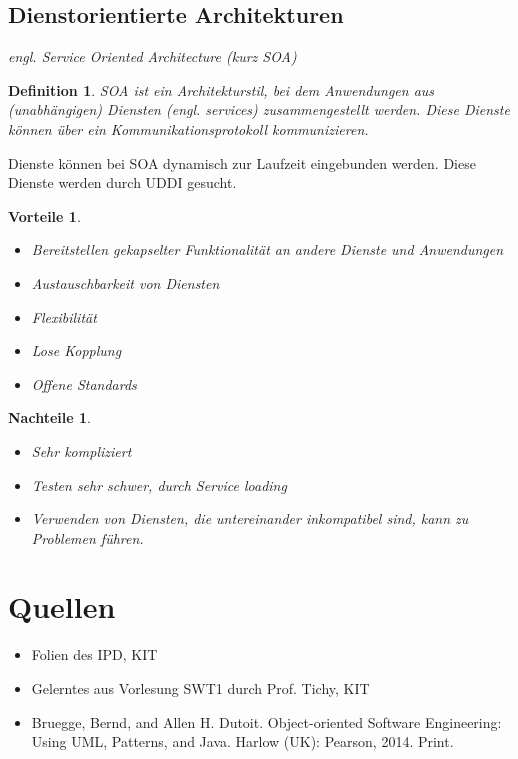 \documentclass[a4paper]{article}
\theoremstyle{break}
\newtheorem{defi}{Definition}[section]
\newtheorem{why}{Vorteile}[section]
\newtheorem{whynot}{Nachteile}[section]
\begin{document}
\subsection{Dienstorientierte Architekturen}
\textit{engl. Service Oriented Architecture (kurz SOA)}
\begin{defi}
	SOA ist ein Architekturstil, bei dem Anwendungen aus (unabhängigen) Diensten (engl. services) zusammengestellt werden. Diese Dienste können über ein Kommunikationsprotokoll kommunizieren.
\end{defi}
Dienste können bei SOA dynamisch zur Laufzeit eingebunden werden. Diese Dienste werden durch UDDI gesucht. 
\begin{why}
	\begin{itemize}
		\item Bereitstellen gekapselter Funktionalität an andere Dienste und Anwendungen
		\item Austauschbarkeit von Diensten
		\item Flexibilität
		\item Lose Kopplung
		\item Offene Standards
	\end{itemize}
\end{why}
\begin{whynot}
	\begin{itemize}
		\item Sehr kompliziert
		\item Testen sehr schwer, durch Service loading
		\item Verwenden von Diensten, die untereinander inkompatibel sind, kann zu Problemen führen.
	\end{itemize}
\end{whynot}
\newpage
\appendix
\section{Quellen}
\begin{itemize}
	\item Folien des IPD, KIT
	\item Gelerntes aus Vorlesung SWT1 durch Prof. Tichy, KIT
	\item Bruegge, Bernd, and Allen H. Dutoit. Object-oriented Software Engineering: Using UML, Patterns, and Java. Harlow (UK): Pearson, 2014. Print. 
\end{itemize}
\end{document}
